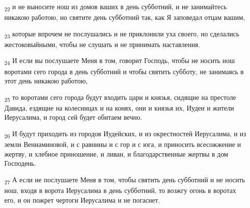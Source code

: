 \begin{tcolorbox}
\textsubscript{22} и не выносите нош из домов ваших в день субботний, и не занимайтесь никакою работою, но святите день субботний так, как Я заповедал отцам вашим,
\end{tcolorbox}
\begin{tcolorbox}
\textsubscript{23} которые впрочем не послушались и не приклонили уха своего, но сделались жестоковыйными, чтобы не слушать и не принимать наставления.
\end{tcolorbox}
\begin{tcolorbox}
\textsubscript{24} И если вы послушаете Меня в том, говорит Господь, чтобы не носить нош воротами сего города в день субботний и чтобы святить субботу, не занимаясь в этот день никакою работою,
\end{tcolorbox}
\begin{tcolorbox}
\textsubscript{25} то воротами сего города будут входить цари и князья, сидящие на престоле Давида, ездящие на колесницах и на конях, они и князья их, Иудеи и жители Иерусалима, и город сей будет обитаем вечно.
\end{tcolorbox}
\begin{tcolorbox}
\textsubscript{26} И будут приходить из городов Иудейских, и из окрестностей Иерусалима, и из земли Вениаминовой, и с равнины и с гор и с юга, и приносить всесожжение и жертву, и хлебное приношение, и ливан, и благодарственные жертвы в дом Господень.
\end{tcolorbox}
\begin{tcolorbox}
\textsubscript{27} А если не послушаете Меня в том, чтобы святить день субботний и не носить нош, входя в ворота Иерусалима в день субботний, то возжгу огонь в воротах его, и он пожрет чертоги Иерусалима и не погаснет.
\end{tcolorbox}
